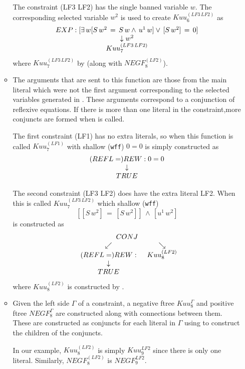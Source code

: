 \begin{enumerate}
\begin{itemize}
The constraint (LF3 LF2) has the single banned variable $w$.
The corresponding selected variable $w^2$ is used to create $Kuu_6^{(LF3\, LF2)}$ as
$${{\begin{array}[t]{c}EXP: [\exists \,w [ S\, w^2 \,= \,S \,w \land \,u^1 \,w] \lor \,[S\,w^2] \,= \,0] \\ \begin{array}[t]{c} \downarrow w^2 \\ Kuu_7^{(LF3\, LF2)}\end{array}\end{array}}}$$
where $Kuu_7^{(LF3\, LF2)}$ by 
(along with $NEGF_8^{(LF2)}$).

\item {\bf {}}
The arguments that are sent to this function are those from the main
literal which were not the first argument corresponding to the selected
variables generated in .
These arguments correspond to a conjunction of reflexive equations.  
If there is more than one literal in the constraint,more
conjuncts are formed when 
is called.

The first constraint (LF1) has no extra literals, so when this function is
called $Kuu_7^{(LF1)}$ with shallow (\verb+wff+) $0=0$
is simply constructed as
$${{\begin{array}[t]{c}(REFL=)REW: 0 = 0 \\ \begin{array}[t]{c} \downarrow \\ {TRUE}\end{array}\end{array}}}$$

The second constraint (LF3 LF2) does have the extra literal LF2.
When this is called $Kuu_7^{(LF3\, LF2)}$ which shallow (\verb+wff+)
$$[[S\, w^2]\, = \, [S\, w^2]]\,\land\, [u^1\, w^2]$$
is constructed as
$${{\begin{array}[t]{c}CONJ \\ \begin{array}[t]{cc} \swarrow & \searrow \\ {{\begin{array}[t]{c}(REFL=)REW:  \\ \begin{array}[t]{c} \downarrow \\ {TRUE}\end{array}\end{array}}} & Kuu_8^{(LF2)} \end{array}\end{array}}}$$
where $Kuu_8^{(LF2)}$ is constructed by
.

\item {\bf {}}
Given the left side $\Gamma$ of a constraint, a negative
ftree $Kuu_8^\Gamma$ and positive ftree $NEGF_8^\Gamma$ 
are constructed along with connections between them.
These are constructed as conjuncts for each literal in $\Gamma$
using  to
construct the children of the conjuncts.

In our example, $Kuu_8^{(LF2)}$ is simply $Kuu_9^{LF2}$ since there
is only one literal.  Similarly, $NEGF_8^{(LF2)}$ is $NEGF_9^{LF2}$.


\end{itemize}
\end{enumerate}
